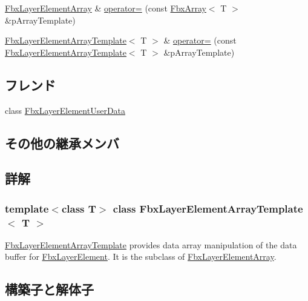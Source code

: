 \begin{DoxyCompactItemize}
\item 
\hyperlink{class_fbx_layer_element_array}{Fbx\+Layer\+Element\+Array} \& \hyperlink{class_fbx_layer_element_array_template_ae914766602cbb45b38ce26765095f222}{operator=} (const \hyperlink{class_fbx_array}{Fbx\+Array}$<$ T $>$ \&p\+Array\+Template)
\item 
\hyperlink{class_fbx_layer_element_array_template}{Fbx\+Layer\+Element\+Array\+Template}$<$ T $>$ \& \hyperlink{class_fbx_layer_element_array_template_a97ad38fd116a2f9ac06d04748e4601b0}{operator=} (const \hyperlink{class_fbx_layer_element_array_template}{Fbx\+Layer\+Element\+Array\+Template}$<$ T $>$ \&p\+Array\+Template)
\end{DoxyCompactItemize}
\subsection*{フレンド}
\begin{DoxyCompactItemize}
\item 
class \hyperlink{class_fbx_layer_element_array_template_a63a2f2e250c191762d21c915d679bbc9}{Fbx\+Layer\+Element\+User\+Data}
\end{DoxyCompactItemize}
\subsection*{その他の継承メンバ}


\subsection{詳解}
\subsubsection*{template$<$class T$>$\newline
class Fbx\+Layer\+Element\+Array\+Template$<$ T $>$}

\hyperlink{class_fbx_layer_element_array_template}{Fbx\+Layer\+Element\+Array\+Template} provides data array manipulation of the data buffer for \hyperlink{class_fbx_layer_element}{Fbx\+Layer\+Element}. It is the subclass of \hyperlink{class_fbx_layer_element_array}{Fbx\+Layer\+Element\+Array}. 

\subsection{構築子と解体子}
\mbox{\label{class_fbx_layer_element_array_template_a624afc7ae56a5caacacd69bcb8bf9ba8}} 
